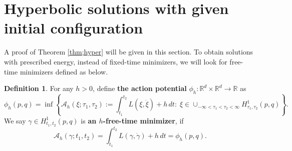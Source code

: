 \documentclass[11pt]{amsart}
\newcommand{\rr}{\mathbb R}
\newcommand{\A}{\mathcal A}
\newcommand{\gm}{\gamma}
\theoremstyle{plain}
\theoremstyle{definition}
\newtheorem{dfn}{Definition}[section]
\theoremstyle{remark}
\begin{document}


\section{Hyperbolic solutions with given initial configuration} \label{sec;hyp-sol}

A proof of Theorem \ref{thm;hyper} will be given in this section. To obtain solutions with prescribed energy, instead of fixed-time minimizers, we will look for free-time minimizers defined as below. 

\begin{dfn}
\label{dfn;free-time-minimizer} For any $h>0$, define \textbf{the action potential} $\phi_h: \rr^d \times \rr^d \to \rr$ as 
$$ \phi_h(p, q) = \inf \left\{ \A_h(\xi; \tau_1, \tau_2) := \int_{t_1}^{t_2} L(\xi, \dot{\xi}) +h \,dt : \; \xi \in \cup_{-\infty < \tau_1 < \tau_2 < \infty} H^1_{\tau_1, \tau_2}(p, q) \right\}.$$
We say $\gm \in H^1_{t_1, t_2}(p, q)$ is \textbf{an $h$-free-time minimizer}, if 
$$ \A_h(\gm; t_1, t_2) = \int_{t_1}^{t_2} L(\gm, \dot{\gm}) +h \,dt = \phi_h(p, q).$$
\end{dfn}
\end{document}
